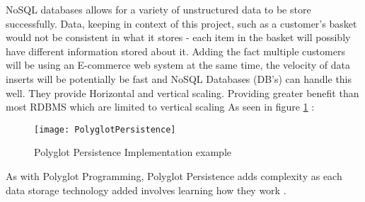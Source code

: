NoSQL databases allows for a variety of unstructured data to be store successfully. Data, keeping in context of this project, such as a customer's basket would not be consistent in what it stores - each item in the basket will possibly have different information stored about it. Adding the fact multiple customers will be using an E-commerce web system at the same time, the velocity of data inserts will be potentially be fast and NoSQL Databases (DB's) can handle this well. They provide Horizontal and vertical scaling. Providing greater benefit than most RDBMS which are limited to vertical scaling
As seen in figure \ref{fig:PolyglotPersistence} \cite{PolyglotSerra}:
\begin{figure}[h]
	\caption{Polyglot Persistence Implementation example}
	\label{fig:PolyglotPersistence}
	\texttt{[image: PolyglotPersistence]}
	\centering
\end{figure}

As with Polyglot Programming, Polyglot Persistence adds complexity as each data storage technology added involves learning how they work \cite{PolyglotSerra}.


